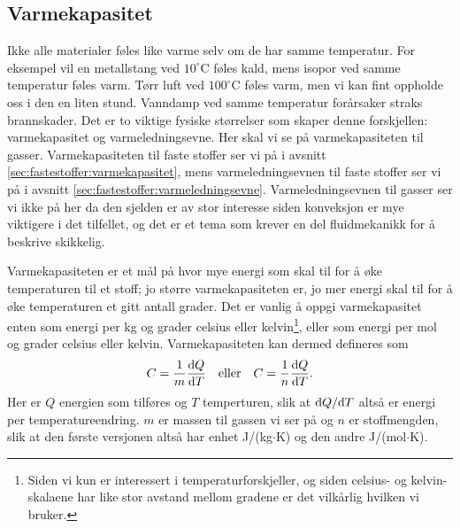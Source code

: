 \subsection{Varmekapasitet}
Ikke alle materialer føles like varme selv om de har samme temperatur. For eksempel vil en metallstang ved $10^\circ\mathrm{C}$ føles kald, mens isopor ved samme temperatur føles varm. Tørr luft ved $100^\circ\mathrm{C}$ føles varm, men vi kan fint oppholde oss i den en liten stund. Vanndamp ved samme temperatur forårsaker straks brannskader. Det er to viktige fysiske størrelser som skaper denne forskjellen: varmekapasitet og varmeledningsevne. Her skal vi se på varmekapasiteten til gasser. Varmekapasiteten til faste stoffer ser vi på i avsnitt \ref{sec:fastestoffer:varmekapasitet}, mens varmeledningsevnen til faste stoffer ser vi på i avsnitt \ref{sec:fastestoffer:varmeledningsevne}. Varmeledningsevnen til gasser ser vi ikke på her da den sjelden er av stor interesse siden konveksjon er mye viktigere i det tilfellet, og det er et tema som krever en del fluidmekanikk for å beskrive skikkelig.

Varmekapasiteten er et mål på hvor mye energi som skal til for å øke temperaturen til et stoff; jo større varmekapasiteten er, jo mer energi skal til for å øke temperaturen et gitt antall grader. Det er vanlig å oppgi varmekapasitet enten som energi per kg og grader celsius eller kelvin\footnote{Siden vi kun er interessert i temperaturforskjeller, og siden celsius- og kelvin-skalaene har like stor avstand mellom gradene er det vilkårlig hvilken vi bruker.}, eller som energi per mol og grader celsius eller kelvin. Varmekapasiteten kan dermed defineres som 
\begin{displaymath}
	C = \frac{1}{m}\frac{\text{d} Q}{\text{d} T}\quad\text{eller}\quad
	C = \frac{1}{n}\frac{\text{d} Q}{\text{d} T}.
\end{displaymath}
Her er $Q$ energien som tilføres og $T$ temperturen, slik at $\text{d} Q/\text{d} T$ altså er energi per temperatureendring. $m$ er massen til gassen vi ser på og $n$ er stoffmengden, slik at den første versjonen altså har enhet J/(kg$\cdot$K) og den andre J/(mol$\cdot$K).

